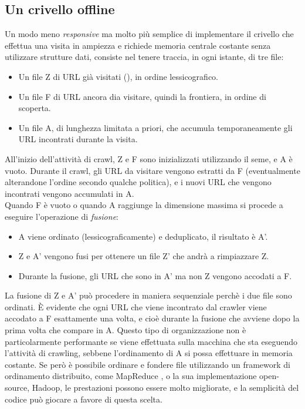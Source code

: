 \subsection{Un crivello offline}
Un modo meno \textit{responsive} ma molto più semplice di implementare il crivello che effettua una visita in ampiezza e richiede memoria centrale costante senza utilizzare strutture dati, consiste nel tenere traccia, in ogni istante, di tre file:
\begin{itemize}
    \item Un file Z di URL già visitati (), in ordine lessicografico.
    \item Un file F di URL ancora dia visitare, quindi la frontiera, in ordine di scoperta.
    \item Un file A, di lunghezza limitata a priori, che accumula temporaneamente gli URL incontrati durante la visita.
\end{itemize}
All'inizio dell'attività di crawl, Z e F sono inizializzati utilizzando il seme, e A è vuoto. Durante il crawl, gli URL da visitare vengono estratti da F (eventualmente alterandone l'ordine secondo qualche politica), e i nuovi URL che vengono incontrati vengono accumulati in A.\\
Quando F è vuoto o quando A raggiunge la dimensione massima si procede a eseguire l'operazione di \textit{fusione}:
\begin{itemize}
    \item A viene ordinato (lessicograficamente) e deduplicato, il risultato è A'.
    \item Z e A' vengono fusi per ottenere un file Z' che andrà a rimpiazzare Z.
    \item Durante la fusione, gli URL che sono in A' ma non Z vengono accodati a F.
\end{itemize}
La fusione di Z e A' può procedere in maniera sequenziale perchè i due file sono ordinati. È evidente che ogni URL che viene incontrato dal crawler viene accodato a F esattamente una volta, e cioè durante la fusione che avviene dopo la prima volta che compare in A.
Questo tipo di organizzazione non è particolarmente performante se viene effettuata sulla macchina che sta eseguendo l'attività di crawling, sebbene l'ordinamento di A si possa effettuare in memoria costante. Se però è possibile ordinare e fondere file utilizzando un framework di ordinamento distribuito, come MapReduce \cite{MapReduce}, o la sua implementazione open-source, Hadoop, le prestazioni possono essere molto migliorate, e la semplicità del codice può giocare a favore di questa scelta.\\
